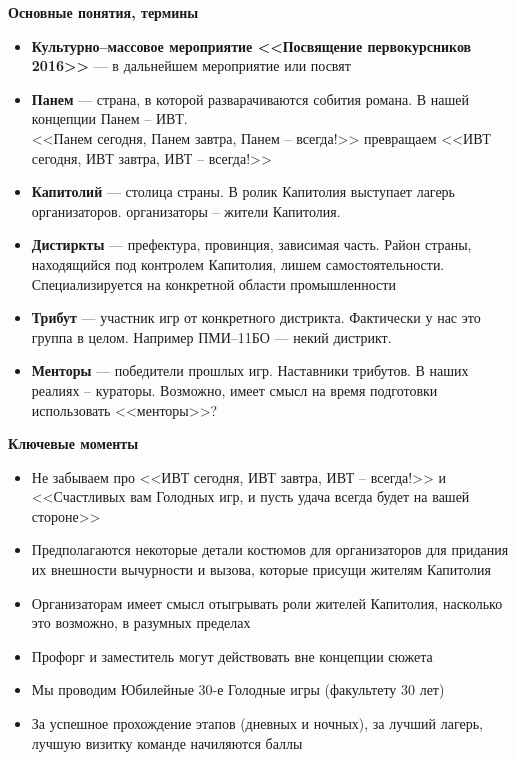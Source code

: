 \documentclass[a4paper, 14pt]{extarticle}
\theoremstyle{definition}
\begin{document}
\textbf{Основные понятия, термины}
\begin{itemize}
\item \textbf{Культурно--массовое мероприятие <<Посвящение первокурсников 2016>>} --- в дальнейшем мероприятие или посвят

\item \textbf{Панем} --- страна, в которой разварачиваются собития романа. В нашей концепции Панем -- ИВТ.\\<<Панем сегодня, Панем завтра, Панем -- всегда!>> превращаем <<ИВТ сегодня, ИВТ завтра, ИВТ -- всегда!>>

\item \textbf{Капитолий} --- столица страны. В ролик Капитолия выступает лагерь организаторов. организаторы -- жители Капитолия.

\item \textbf{Дистиркты} --- префектура, провинция, зависимая часть. Район страны, находящийся под контролем Капитолия, лишем самостоятельности. Специализируется на конкретной области промышленности

\item \textbf{Трибут} --- участник игр от конкретного дистрикта. Фактически у нас это группа в целом. Например ПМИ--11БО --- некий дистрикт.

\item \textbf{Менторы} --- победители прошлых игр. Наставники трибутов. В наших реалиях -- кураторы. Возможно, имеет смысл на время подготовки использовать <<менторы>>?


\end{itemize}


\textbf{Ключевые моменты}
\begin{itemize}
\item Не забываем про <<ИВТ сегодня, ИВТ завтра, ИВТ -- всегда!>> и <<Счастливых вам Голодных игр, и пусть удача всегда будет на вашей стороне>>

\item Предполагаются некоторые детали костюмов для организаторов для придания их внешности вычурности и вызова, которые присущи жителям Капитолия

\item Организаторам имеет смысл отыгрывать роли жителей Капитолия, насколько это возможно, в разумных пределах

\item Профорг и заместитель могут действовать вне концепции сюжета

\item Мы проводим Юбилейные 30-е Голодные игры (факультету 30 лет)

\item За успешное прохождение этапов (дневных и ночных), за лучший лагерь, лучшую визитку команде начиляются баллы
\end{itemize}
\end{document}
